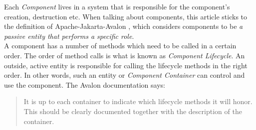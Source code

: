 Each \emph{Component} lives in a system that is responsible for the component's
creation, destruction etc. When talking about components, this article sticks
to the definition of Apache-Jakarta-Avalon \cite{jakarta}, which considers
components to be \emph{a passive entity that performs a specific role}.\\
A component has a number of methods which need to be called in a certain order.
The order of method calls is what is known as \emph{Component Lifecycle}.
An outside, active entity is responsible for calling the lifecycle methods
in the right order. In other words, such an entity or \emph{Component Container}
can control and use the component. The Avalon documentation \cite{jakarta} says:

\begin{quotation}
It is up to each container to indicate which lifecycle methods it will honor.
This should be clearly documented together with the description of the container.
\end{quotation}

